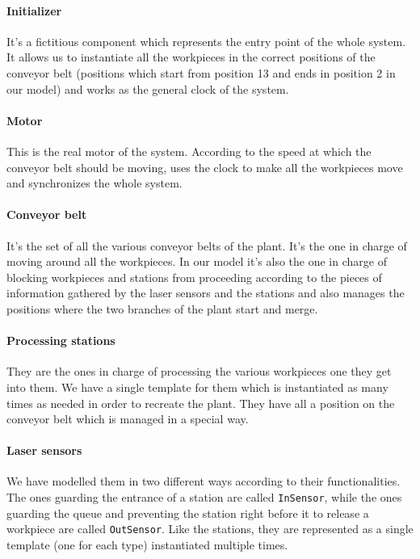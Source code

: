 \documentclass[a4paper]{article}
\begin{document}
    \paragraph{Initializer} It's a fictitious component which represents the entry point of the whole system. It allows us to instantiate all the workpieces in the correct positions of the conveyor belt (positions which start from position 13 and ends in position 2 in our model) and works as the general clock of the system.

    \paragraph{Motor} This is the real motor of the system. According to the speed at which the conveyor belt should be moving, uses the clock to make all the workpieces move and synchronizes the whole system.

    \paragraph{Conveyor belt} It's the set of all the various conveyor belts of the plant. It's the one in charge of moving around all the workpieces. In our model it's also the one in charge of blocking workpieces and stations from proceeding according to the pieces of information gathered by the laser sensors and the stations and also manages the positions where the two branches of the plant start and merge.

    \paragraph{Processing stations} They are the ones in charge of processing the various workpieces one they get into them. We have a single template for them which is instantiated as many times as needed in order to recreate the plant. They have all a position on the conveyor belt which is managed in a special way.

    \paragraph{Laser sensors} We have modelled them in two different ways according to their functionalities. The ones guarding the entrance of a station are called \texttt{InSensor}, while the ones guarding the queue and preventing the station right before it to release a workpiece are called \texttt{OutSensor}. Like the stations, they are represented as a single template (one for each type) instantiated multiple times.
\end{document}

